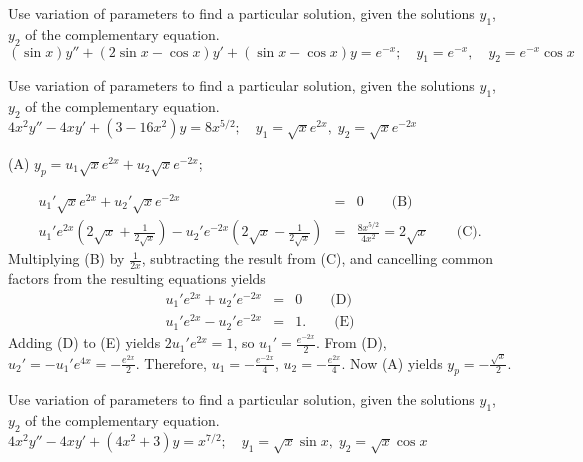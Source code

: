 \documentclass{ximera}
\begin{document}
\begin{problem}\label{exer:5.7.19}
Use variation
of parameters to find a particular solution, given the solutions
$y_1$, $y_2$ of the complementary equation. $(\sin x)y''+(2\sin x-\cos x)y'+(\sin x-\cos x)y=e^{-x}; \quad
y_1=e^{-x},\quad y_2=e^{-x}\cos x$
\end{problem}

\begin{problem}\label{exer:5.7.20}
Use variation
of parameters to find a particular solution, given the solutions
$y_1$, $y_2$ of the complementary equation. $4x^2y''-4xy'+(3-16x^2)y=8x^{5/2}; \quad  y_1=\sqrt xe^{2x},\;  y_2=\sqrt
xe^{-2x}$

\begin{solution}
(A) $y_p=u_1\sqrt xe^{2x}+u_2\sqrt xe^{-2x}$;

\begin{eqnarray*}
u_1'\sqrt xe^{2x}+u_2'\sqrt xe^{-2x}&=&0\qquad\text{(B)}\\ %
u_1'e^{2x}\left(2\sqrt x+\frac{1}{2\sqrt x}\right)-u_2'e^{-2x}
\left(2\sqrt x-\frac{1}{2\sqrt x}\right)&=&\frac{8x^{5/2}}{4x^2}
=2\sqrt x\qquad\text{(C)}. %
\end{eqnarray*}
Multiplying (B) by $\frac{1}{2x}$, subtracting the
result from (C), and cancelling common factors from
the resulting equations yields
\begin{eqnarray*}
u_1'e^{2x}+u_2'e^{-2x}&=&0\qquad\text{(D)}\\ %
u_1'e^{2x}-u_2'e^{-2x}&=&1.\qquad\text{(E)} %
\end{eqnarray*}
Adding (D) to (E) yields
$2u_1'e^{2x}=1$, so $u_1'=\frac{e^{-2x}}{2}$. From
(D), $u_2'=-u_1'e^{4x}=-\frac{e^{2x}}{2}$.
Therefore, $u_1=-\frac{e^{-2x}}{4}$, $u_2=-\frac{e^{2x}}{4}$. Now
(A) yields $y_p=-\frac{\sqrt x}{2}$.

\end{solution}
\end{problem}

\begin{problem}\label{exer:5.7.21}
Use variation
of parameters to find a particular solution, given the solutions
$y_1$, $y_2$ of the complementary equation. $4x^2y''-4xy'+(4x^2+3)y=x^{7/2}; \quad  y_1=\sqrt x\sin x,\;
y_2=\sqrt x\cos x$
\end{problem}
\end{document}
